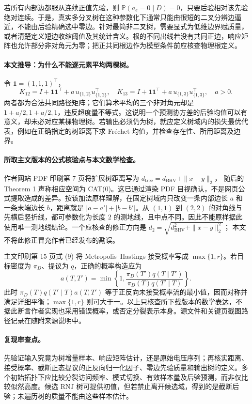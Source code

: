 \documentclass[UTF8,11pt,fontset=fandol]{ctexart}
\theoremstyle{remark}
\numberwithin{equation}{section}
\begin{document}
若所有内部边都服从连续正值先验，则
$\mathbb P(a_e=0\mid D)=0$，只要后验相对该先验绝对连续。于是，真实多分叉树在这种参数化下通常只能由很短的二叉分辨边逼近，不能由后验精确选中零边。针对最简非二叉树，需要显式为低维边界赋质量，或者清楚定义短边收缩阈值及其统计含义。根的不同出线若没有共同正边，响应矩阵也允许部分非对角元为零；把正共同根边作为模型条件前应核查物理根定义。

\paragraph{本文推导：为什么不能逐元素平均两棵树。}
令 $\mathbf1=(1,1,1)^\top$，
\[
 K_{12}=I+\mathbf1\mathbf1^\top+a\,u_{\{1,2\}}u_{\{1,2\}}^\top,\quad
 K_{13}=I+\mathbf1\mathbf1^\top+a\,u_{\{1,3\}}u_{\{1,3\}}^\top,\quad a>0.
\]
两者都为合法共同路径矩阵；它们算术平均的三个非对角元却是
$1+a/2,1+a/2,1$，违反超度量不等式。这说明一个预测协方差的后验均值可以有意义，却未必对应某棵物理树。若输出必须仍为树，就应定义树域内的损失最优代表，例如在正确指定的树距离下求 Fr\'echet 均值，并检查存在性、所用距离及边界。

\paragraph{所取主文版本的公式核验点与本文数学检查。}
作者网站 PDF 印刷第 7 页将扩展树距离写为
$d_{\mathrm{tree}}=d_{\mathrm{BHV}}+\|x-y\|_2$，
随后的 Theorem 1 声称相应空间为 CAT(0)。这已通过渲染 PDF 目视确认，不是网页公式提取造成的差异。按该加法原样理解，在固定树域内只改变一条内部边长 $a$ 和一条末端边长 $b$，距离就是 $|a-a'|+|b-b'|$。从 $(1,1)$ 到 $(2,2)$ 的对角线与先横后竖折线，都可参数化为长度 $2$ 的测地线，且中点不同。因此不能原样据此使用唯一测地线结论。一个应核查的修正方向是
$d_2=\sqrt{d_{\mathrm{BHV}}^2+\|x-y\|_2^2}$；
本文不将此修正冒充作者已经发布的勘误。

主文印刷第 15 页式 (9) 将 Metropolis--Hastings 接受概率写成
$\max\{1,r\}$。若目标密度为 $\pi_D$、提议为 $q$，正确的概率构造应为
\[
 a(T,T')=\min\!\left\{1,
 \frac{\pi_D(T')q(T\mid T')}{\pi_D(T)q(T'\mid T)}\right\}.
\]
此时 $\pi_D(T)q(T'\mid T)a(T,T')$ 等于正反向未接受概率流的最小值，因而对称并满足详细平衡；$\max\{1,r\}$ 则可大于一。以上只核查所下载版本的数学表达，不据此断言作者实现也采用错误概率，或否定分裂表示本身。源文件和关键页截图路径记录在随附来源说明中。

\paragraph{复现审查点。}
先验证输入究竟为树增量样本、响应矩阵估计，还是原始电压序列；再核实距离、接受概率、截断正态提议的正反向归一化因子、零边先验质量和输出树的定义。多个初始拓扑下应比较分裂访问频率、模式切换、有效样本量及后验预测，而非仅比较似然高度。候选 RNJ 树可提供初值，但若禁止离开候选域，得到的是截断后验；未遍历树的质量不能由这些样本估计。
\end{document}
